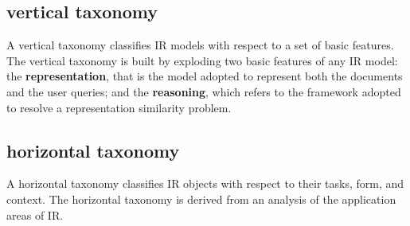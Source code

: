 \subsection{vertical taxonomy}

A vertical taxonomy classifies IR models with respect to a set of basic features.
The vertical taxonomy is built by exploding two basic features of any IR model: the \textbf{representation}, that is the model adopted to represent both the documents and the user queries; and the \textbf{reasoning}, which refers to the framework adopted to resolve a representation similarity problem. 

\subsection{horizontal taxonomy}

A horizontal taxonomy classifies IR objects with respect to their tasks, form, and context. 
The horizontal taxonomy is derived from an analysis of the application areas of IR.











































